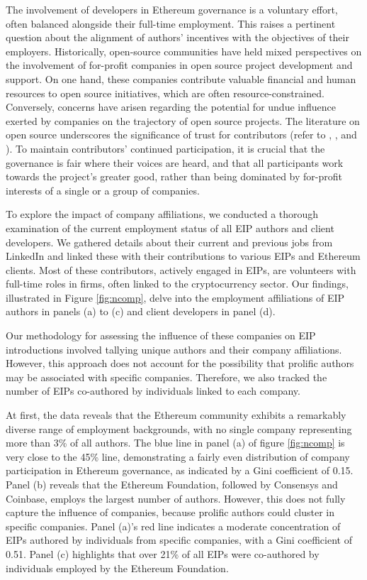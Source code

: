 \documentclass[No]{AEA}
\begin{document}
The involvement of developers in Ethereum governance is a voluntary effort, often balanced alongside their full-time employment. This raises a pertinent question about the alignment of authors' incentives with the objectives of their employers. Historically, open-source communities have held mixed perspectives on the involvement of for-profit companies in open source project development and support. On one hand, these companies contribute valuable financial and human resources to open source initiatives, which are often resource-constrained. Conversely, concerns have arisen regarding the potential for undue influence exerted by companies on the trajectory of open source projects. The literature on open source underscores the significance of trust for contributors (refer to \cite{Jarvenpaaetal2004}, \cite{Korsgaardetal1995}, and \cite{StewartGosain2006}). To maintain contributors' continued participation, it is crucial that the governance is fair where their voices are heard, and that all participants work towards the project's greater good, rather than being dominated by for-profit interests of a single or a group of companies.

To explore the impact of company affiliations, we conducted a thorough examination of the current employment status of all EIP authors and client developers. We gathered details about their current and previous jobs from LinkedIn and linked these with their contributions to various EIPs and Ethereum clients. Most of these contributors, actively engaged in EIPs, are volunteers with full-time roles in firms, often linked to the cryptocurrency sector. Our findings, illustrated in Figure \ref{fig:ncomp}, delve into the employment affiliations of EIP authors in panels (a) to (c) and client developers in panel (d).

Our methodology for assessing the influence of these companies on EIP introductions involved tallying unique authors and their company affiliations. However, this approach does not account for the possibility that prolific authors may be associated with specific companies. Therefore, we also tracked the number of EIPs co-authored by individuals linked to each company.

At first, the data reveals that the Ethereum community exhibits a remarkably diverse range of employment backgrounds, with no single company representing more than 3\% of all authors. The blue line in panel (a) of figure \ref{fig:ncomp} is very close to the 45\% line, demonstrating a fairly even distribution of company participation in Ethereum governance, as indicated by a Gini coefficient of 0.15. Panel (b) reveals that the Ethereum Foundation, followed by Consensys and Coinbase, employs the largest number of authors. However, this does not fully capture the influence of companies, because prolific authors could cluster in specific companies. Panel (a)'s red line indicates a moderate concentration of EIPs authored by individuals from specific companies, with a Gini coefficient of 0.51. Panel (c) highlights that over 21\% of all EIPs were co-authored by individuals employed by the Ethereum Foundation. 
\end{document}
